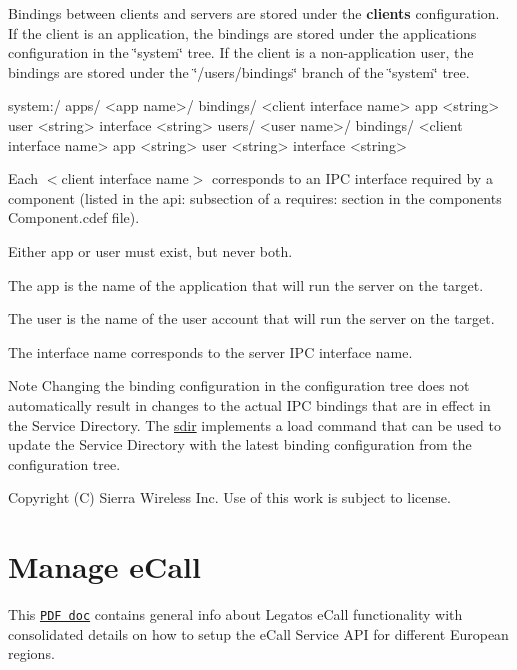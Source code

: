 Bindings between clients and servers are stored under the {\bfseries client\textquotesingle{}s} configuration. If the client is an application, the bindings are stored under the application\textquotesingle{}s configuration in the \char`\"{}system\char`\"{} tree. If the client is a non-\/application user, the bindings are stored under the \char`\"{}/users/bindings\char`\"{} branch of the \char`\"{}system\char`\"{} tree.

\begin{DoxyVerb}system:/
    apps/
        <app name>/
            bindings/
                <client interface name>
                        app         <string>
                        user        <string>
                        interface   <string>
    users/
        <user name>/
            bindings/
                <client interface name>
                        app         <string>
                        user        <string>
                        interface   <string>\end{DoxyVerb}


Each {\ttfamily $<$client interface name$>$} corresponds to an I\+P\+C interface required by a component (listed in the {\ttfamily api\+:} subsection of a {\ttfamily requires\+:} section in the component\textquotesingle{}s {\ttfamily Component.\+cdef} file).

Either {\ttfamily app} or {\ttfamily user} must exist, but never both.

The {\ttfamily app} is the name of the application that will run the server on the target.

The {\ttfamily user} is the name of the user account that will run the server on the target.

The {\ttfamily interface} name corresponds to the server I\+P\+C interface name.

\begin{DoxyNote}{Note}
Changing the binding configuration in the configuration tree does not automatically result in changes to the actual I\+P\+C bindings that are in effect in the Service Directory. The \hyperlink{toolsTarget_sdir}{sdir} implements a {\ttfamily load} command that can be used to update the Service Directory with the latest binding configuration from the configuration tree.
\end{DoxyNote}




Copyright (C) Sierra Wireless Inc. Use of this work is subject to license. \hypertarget{howToEcall}{}\section{Manage e\+Call}\label{howToEcall}
This \href{http://source.sierrawireless.com/resources/legato/ecallinterface/}{\tt P\+D\+F doc} contains general info about Legato\textquotesingle{}s e\+Call functionality with consolidated details on how to setup the e\+Call Service A\+P\+I for different European regions.

